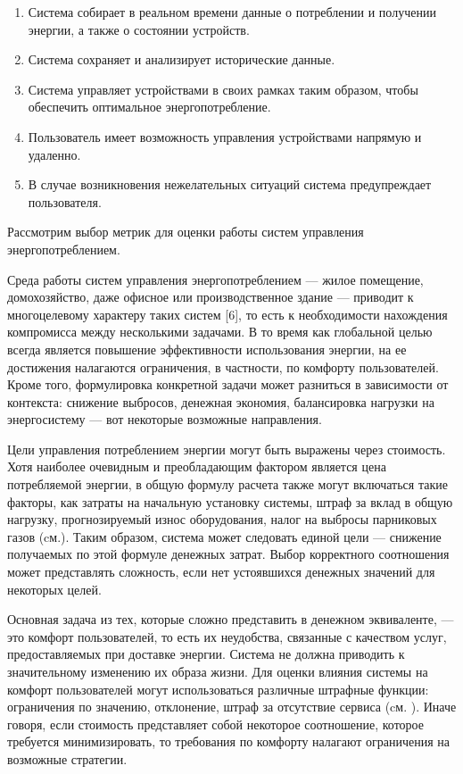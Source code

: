 \begin{enumerate}
	\item Система собирает в реальном времени данные о потреблении и получении энергии, а также о состоянии устройств.
	\item Система сохраняет и анализирует исторические данные.
	\item Система управляет устройствами в своих рамках таким образом, чтобы обеспечить оптимальное энергопотребление.
	\item Пользователь имеет возможность управления устройствами напрямую и удаленно.
	\item В случае возникновения нежелательных ситуаций система предупреждает пользователя.
\end{enumerate}

Рассмотрим выбор метрик для оценки работы систем управления энергопотреблением.

Среда работы систем управления энергопотреблением --- жилое помещение, домохозяйство, даже офисное или производственное здание --- приводит к многоцелевому характеру таких систем [6], то есть к необходимости нахождения компромисса между несколькими задачами. В то время как глобальной целью всегда является повышение эффективности использования энергии, на ее достижения налагаются ограничения, в частности, по комфорту пользователей. Кроме того, формулировка конкретной задачи может разниться в зависимости от контекста: снижение выбросов, денежная экономия, балансировка нагрузки на энергосистему — вот некоторые возможные направления.

Цели управления потреблением энергии могут быть выражены через стоимость. Хотя наиболее очевидным и преобладающим фактором является цена потребляемой энергии, в общую формулу расчета также могут включаться такие факторы, как затраты на начальную установку системы, штраф за вклад в общую нагрузку, прогнозируемый износ оборудования, налог на выбросы парниковых газов (cм.). Таким образом, система может следовать единой цели — снижение получаемых по этой формуле денежных затрат. Выбор корректного соотношения может представлять сложность, если нет устоявшихся денежных значений для некоторых целей.

Основная задача из тех, которые сложно представить в денежном эквиваленте, — это комфорт пользователей, то есть их неудобства, связанные с качеством услуг, предоставляемых при доставке энергии. Система не должна приводить к значительному изменению их образа жизни. Для оценки влияния системы на комфорт пользователей могут использоваться различные штрафные функции: ограничения по значению, отклонение, штраф за отсутствие сервиса (cм. ). Иначе говоря, если стоимость представляет собой некоторое соотношение, которое требуется минимизировать, то требования по комфорту налагают ограничения на возможные стратегии.

